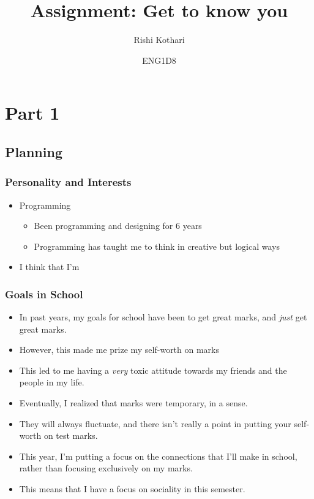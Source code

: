 \documentclass[]{article}
\title{\Huge Assignment: \textbf{Get to know you}}
\author{\LARGE Rishi Kothari}
\date{ENG1D8}
\begin{document}
\maketitle

\newpage


\section*{Part 1}
\subsection*{Planning}
\subsubsection*{Personality and Interests}
\begin{itemize}
    \item Programming
    \begin{itemize}
        \item Been programming and designing for 6 years
        \item Programming has taught me to think in creative but logical ways
    \end{itemize}
    \item I think that I'm 
\end{itemize}
\subsubsection*{Goals in School}
\begin{itemize}
    \item In past years, my goals for school have been to get great marks, and \textit{just} get great marks.
    \item However, this made me prize my self-worth on marks
    \item This led to me having a \textit{very} toxic attitude towards my friends and the people in my life.
    \item Eventually, I realized that marks were temporary, in a sense.
    \item They will always fluctuate, and there isn't really a point in putting your self-worth on test marks.
    \item This year, I'm putting a focus on the connections that I'll make in school, rather than focusing exclusively on my marks.
    \item This means that I have a focus on sociality in this semester.
\end{itemize}
\end{document}
